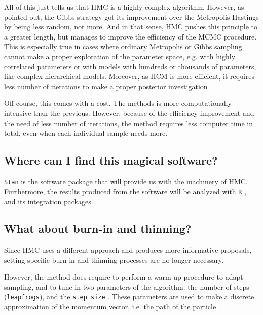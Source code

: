 All of this just tells us that HMC is a highly complex algorithm. However, as \citet{McElreath_2020} pointed out, the Gibbs strategy got its improvement over the Metropolis-Hastings by being less random, not more. And in that sense, HMC pushes this principle to a greater length, but manages to improve the efficiency of the MCMC procedure. This is especially true in cases where ordinary Metropolis or Gibbs sampling cannot make a proper exploration of the parameter space, e.g. with highly correlated parameters or with models with hundreds or thousands of parameters, like complex hierarchical models. Moreover, as HCM is more efficient, it requires less number of iterations to make a proper posterior investigation \cite{McElreath_2020, Gelman_et_al_2014} 

Off course, this comes with a cost. The methods is more computationally intensive than the previous. However, because of the efficiency improvement and the need of less number of iterations, the method requires less computer time in total, even when each individual sample needs more.


\subsection{Where can I find this magical software?} \label{sub_sect:software}

\texttt{Stan} \cite{Stan2020} is the software package that will provide us with the machinery of HMC. Furthermore, the results produced from the software will be analyzed with \texttt{R} \cite{R2015, RStan2020}, and its integration packages. 


\subsection{What about burn-in and thinning?} \label{sub_sect:burn}

Since HMC uses a different approach and produces more informative proposals, setting specific burn-in and thinning processes are no longer necessary.

However, the method does require to perform a warm-up procedure to adapt sampling, and to tune in two parameters of the algorithm: the number of steps (\texttt{leapfrogs}), and the \texttt{step size} \cite{Stan2020}. These parameters are used to make a discrete approximation of the momentum vector, i.e. the path of the particle \cite{Neal_2011, Betancourt_et_al_2013}. 

